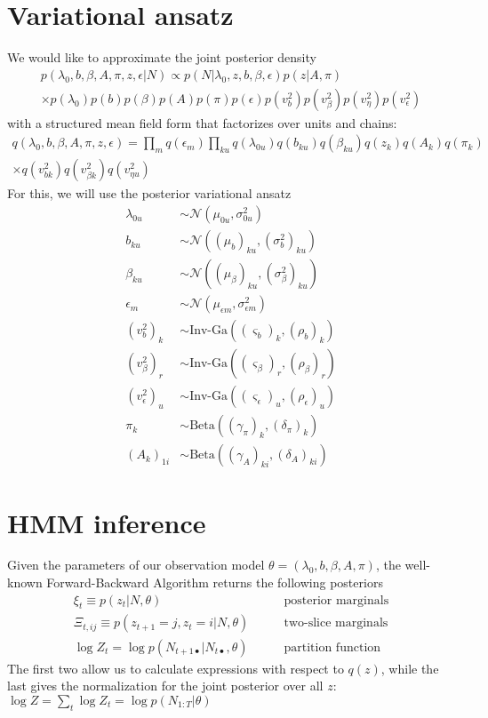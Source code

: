 \documentclass[11pt]{article}
\begin{document}
\section{Variational ansatz}
We would like to approximate the joint posterior density 
\begin{multline}
    p(\lambda_0, b, \beta, A, \pi, z, \epsilon|N) \propto p(N|\lambda_0, z, b, \beta, \epsilon) p(z|A, \pi) \\
    \times p(\lambda_0) p(b) p(\beta) p(A) p(\pi) p(\epsilon) p(v^2_b) p(v^2_\beta) p(v^2_\eta) p(v^2_\epsilon)
\end{multline}
with a structured mean field form that factorizes over units and chains:
\begin{multline}
    q(\lambda_0, b, \beta, A, \pi, z, \epsilon) = \prod_m q(\epsilon_m) \prod_{ku} q(\lambda_{0u}) 
    q(b_{ku}) q(\beta_{ku}) q(z_k) q(A_k) q(\pi_k) \\
    \times q(v^2_{bk}) q(v^2_{\beta k}) q(v^2_{\eta u})
\end{multline}
For this, we will use the posterior variational ansatz
\begin{align}
    \lambda_{0u} &\sim \mathcal{N}\left(\mu_{0u}, \sigma^2_{0u}\right) \\
    b_{ku} &\sim \mathcal{N}\left((\mu_b)_{ku}, (\sigma^2_b)_{ku}\right) \\
    \beta_{ku} &\sim \mathcal{N}\left((\mu_\beta)_{ku}, (\sigma^2_\beta)_{ku}\right) \\
    \epsilon_m &\sim \mathcal{N}\left(\mu_{\epsilon m}, \sigma^2_{\epsilon m}\right) \\
    (v^2_b)_{k} &\sim \text{Inv-Ga}\left((\varsigma_b)_{k}, (\rho_b)_{k} \right) \\
    (v^2_\beta)_{r} &\sim \text{Inv-Ga}\left((\varsigma_\beta)_r, (\rho_\beta)_r \right) \\
    (v^2_\epsilon)_{u} &\sim \text{Inv-Ga}\left((\varsigma_\epsilon)_u, (\rho_\epsilon)_u \right) \\
    \pi_k &\sim \mathrm{Beta}\left((\gamma_\pi)_k, (\delta_\pi)_k \right) \\ 
    \left(A_k \right)_{1i} &\sim \mathrm{Beta}\left((\gamma_A)_{ki}, (\delta_A)_{ki} \right)  
\end{align}

\section{HMM inference}
Given the parameters of our observation model $\theta = (\lambda_0, b, \beta, A, \pi)$, the well-known Forward-Backward Algorithm returns the following posteriors
\begin{align}
    \xi_t \equiv p(z_t|N, \theta) &\qquad \text{posterior marginals} \\
    \Xi_{t, ij} \equiv p(z_{t+1} = j, z_t = i|N, \theta) &\qquad \text{two-slice marginals} \\
    \log Z_t = \log p(N_{t+1 \bullet}|N_{t\bullet}, \theta) &\qquad \text{partition function}
\end{align}
The first two allow us to calculate expressions with respect to $q(z)$, while the last gives the normalization for the joint posterior over all $z$: $\log Z = \sum_t \log Z_t = \log p(N_{1:T}|\theta)$
\end{document}
